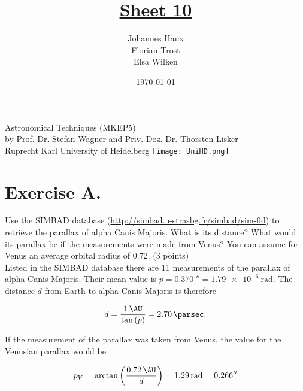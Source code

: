 \documentclass[11pt,a4paper,twoside]{article}
\title{\LARGE \underline {Sheet 10}}
\author{Johannes Haux \\ Florian Trost \\ Elsa Wilken}
\date{\today}
\begin{document}
\maketitle
\thispagestyle{empty}

\begin{center}
  Astronomical Techniques (MKEP5) \\
  \baselineskip35pt
  by Prof. Dr. Stefan Wagner and Priv.-Doz. Dr. Thorsten Lisker \\
  \baselineskip60pt
  Ruprecht Karl University of Heidelberg
\vskip 40pt
\texttt{[image: UniHD.png]}

\end{center}

\newpage
\setcounter{page}{1}		%

\section*{Exercise A.}

Use the SIMBAD database (\url{http://simbad.u-strasbg.fr/simbad/sim-fid}) to retrieve the parallax of alpha Canis Majoris. What is its distance? What would its parallax be if the measurements were made from Venus? You can assume for Venus an average orbital radius of \SI{0.72}{\AU}. (3 points) \\

Listed in the SIMBAD database there are \num{11} measurements of the parallax of alpha Canis Majoris. Their mean value is $p = \SI{0.370}{\arcsecond} = \SI{1.79e-6}{\radian}$. The distance $d$ from Earth to alpha Canis Majoris is therefore

\begin{equation}
 d = \frac{\SI{1}{\AU}}{\tan \left( p \right) } = \SI{2.70}{\parsec}.
\end{equation}

If the measurement of the parallax was taken from Venus, the value for the Venusian parallax would be 

\begin{equation}
 p_V = \arctan \left( \frac{\SI{0.72}{\AU}}{d} \right) = \SI{1.29}{\radian} = \SI{0.266}{\arcsecond}
\end{equation}
\end{document}
